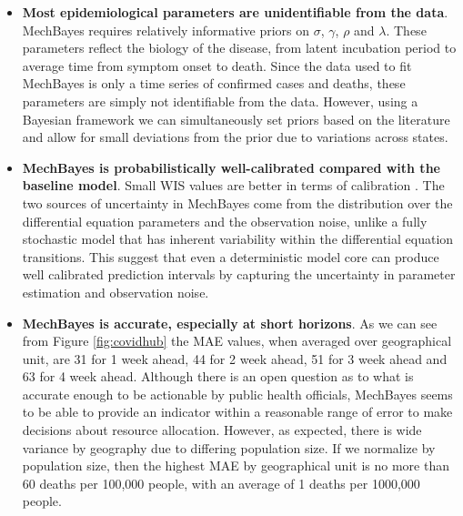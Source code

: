 \documentclass[11pt]{amsart}
\begin{document}
\begin{itemize}
\item \textbf{Most epidemiological parameters are unidentifiable from the data}. MechBayes requires relatively informative priors on $\sigma$, $\gamma$, $\rho$ and $\lambda$. These parameters reflect the biology of the disease, from latent incubation period to average time from symptom onset to death. Since the data used to fit MechBayes is only a time series of confirmed cases and deaths, these parameters are simply not identifiable from the data. However, using a Bayesian framework we can simultaneously set priors based on the literature and allow for small deviations from the prior due to variations across states. 

\item \textbf{MechBayes is probabilistically well-calibrated compared with the baseline model}. Small WIS values are better in terms of calibration \cite{bracher2020evaluating}. The two sources of uncertainty in MechBayes come from the distribution over the differential equation parameters and the observation noise, unlike a fully stochastic model that has inherent variability within the differential equation transitions. This suggest that even a deterministic model core can produce well calibrated prediction intervals by capturing the uncertainty in parameter estimation and observation noise. 



\item \textbf{MechBayes is accurate, especially at short horizons}. As we can see from Figure \ref{fig:covidhub} the MAE values, when averaged over geographical unit, are 31 for 1 week ahead, 44 for 2 week ahead, 51 for 3 week ahead and 63 for 4 week ahead. Although there is an open question as to what is accurate enough to be actionable by public health officials, MechBayes seems to be able to provide an indicator within a reasonable range of error to make decisions about resource allocation. However, as expected, there is wide variance by geography due to differing population size. If we normalize by population size, then the highest MAE by geographical unit is no more than 60 deaths per 100,000 people, with an average of 1 deaths per 1000,000 people.


\end{itemize}
\end{document}
